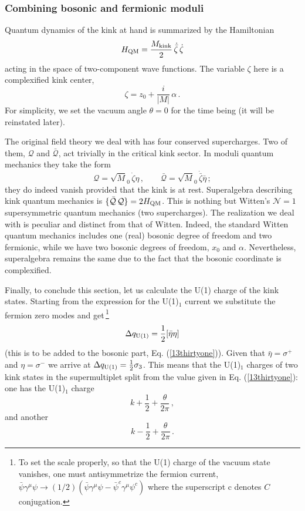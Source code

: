 \documentclass[epsfig,12pt]{article}
\def\beq{\begin{equation}}
\def\eeq{\end{equation}}
\def\beq{\begin{equation}}
\def\eeq{\end{equation}}
\begin{document}
\subsubsection{Combining bosonic and fermionic moduli}
\label{cbfm}

Quantum dynamics of the kink at hand is summarized by the
Hamiltonian
\beq
H_{\rm QM} =  \frac{M_{\rm kink}}{2}\,\dot{\bar\zeta}\, \dot\zeta
\label{13fourtynine}
\eeq
acting in the space of two-component wave functions.
The variable $\zeta$ here is a complexified kink center,
\beq
\zeta = z_0 + \frac{i}{|M|}\, \alpha\,.
\label{13fifty}
\eeq
For simplicity, we set the vacuum angle $\theta =0$ for the time being
(it will be reinstated later). 

The original field theory we deal with has four conserved supercharges.
Two of them, ${\mathcal Q}$ and $\bar {\mathcal Q}$, 
act trivially in the critical kink sector. In moduli quantum
mechanics they take the form
\beq
{\mathcal Q}= {\sqrt M_0}\,  \dot\zeta\eta\,,\qquad 
\bar {\mathcal Q}=  {\sqrt M_0}\, \dot{\bar\zeta}\bar \eta \, ;
\label{13fiftyone}
\eeq
they do indeed vanish provided that the kink is at rest.
Superalgebra describing kink quantum mechanics is
$\{\bar {\mathcal Q}\, {\mathcal Q}\} = 2 H_{\rm QM}$. This is nothing but 
Witten's ${\mathcal N}=1$
supersymmetric quantum mechanics  (two supercharges).
The realization we deal with is peculiar and distinct from 
that of Witten. Indeed, the standard Witten quantum mechanics
includes one (real) bosonic degree of freedom and two fermionic, while
we have two bosonic degrees of freedom,
$x_0$ and $\alpha$. Nevertheless, superalgebra remains the same
due to the fact that the bosonic coordinate is complexified.
 
Finally, to conclude this section, let us calculate the U(1) charge
of the kink states. Starting from the expression  for the U(1)$_1$ current we
substitute the fermion zero modes and get\,\footnote{To set the scale properly, so that
the U(1) charge of the vacuum state vanishes, one must
antisymmetrize
the fermion current, $\bar\psi\gamma^\mu\psi \to
(1/2)\left(\bar\psi\gamma^\mu\psi - \bar\psi^c\gamma^\mu\psi^c
\right)
$ where the superscript c denotes $C$ conjugation.}
\beq
\Delta q_{\rm U(1)} = \frac{1}{2} [\bar\eta\eta ]
\label{13fiftytwo}
\eeq
(this is to be added to the bosonic part, Eq. (\ref{13thirtyone})).
Given that $\bar \eta = \sigma^+$ and $ \eta = \sigma^-$ we arrive at
$\Delta q_{\rm U(1)} = \frac{1}{2} \sigma_3$. This means that the U(1)$_1$ charges
of two kink states in the supermultiplet
split from the value given in Eq. (\ref{13thirtyone}):
one has the U(1)$_1$ charge
$$
k+\frac{1}{2} +\frac{\theta}{2\pi}\,,
$$
and another
$$
k-\frac{1}{2} +\frac{\theta}{2\pi}\,.
$$
\end{document}
